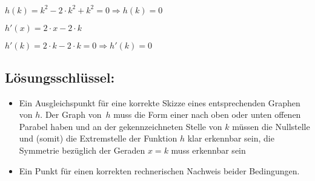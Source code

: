 \begin{langesbeispiel}
{\begin{enumerate}
$h(k)=k^2-2\cdot k^2+k^2=0 \Rightarrow h(k)=0$

$h'(x)=2\cdot x-2\cdot k$

$h'(k)=2\cdot k-2\cdot k=0 \Rightarrow h'(k)=0$
	
	\subsection{Lösungsschlüssel:}
	
\begin{itemize}
	\item Ein Ausgleichspunkt für eine korrekte Skizze eines entsprechenden Graphen von $h$. Der Graph von $h$ muss die Form einer nach oben oder unten offenen Parabel haben und an der gekennzeichneten Stelle von $k$ müssen die Nullstelle und (somit) die Extremstelle der Funktion $h$ klar erkennbar sein, die Symmetrie bezüglich der Geraden  $x=k$  muss erkennbar sein
	\item Ein Punkt für einen korrekten rechnerischen Nachweis beider Bedingungen.
\end{itemize}

\end{enumerate}}
		\end{langesbeispiel}